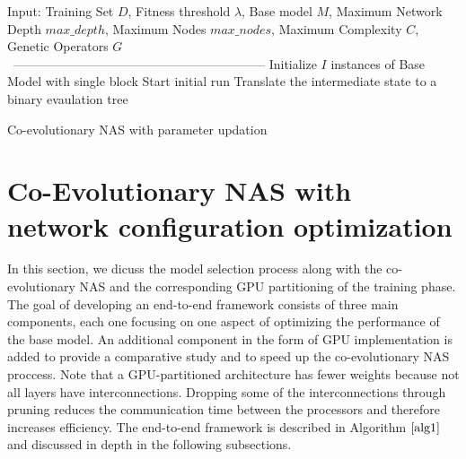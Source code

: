 \documentclass[conference]{IEEEtran}
\begin{document}
\begin{algorithm}[!t]
\scriptsize
\SetAlgoLined
Input: Training Set $D$, Fitness threshold $\lambda$, Base model $M$, Maximum Network Depth $max\_depth$, Maximum Nodes $max\_nodes$, Maximum Complexity $C$, Genetic Operators $G$\\
\
------------------------------------------------------------
Initialize $I$ instances of Base Model with single block\;
Start initial run\;
Translate the intermediate state to a binary evaulation tree\;
\caption{Co-evolutionary NAS with parameter updation}
\label{alg1}
\end{algorithm}


\section{Co-Evolutionary NAS with network configuration optimization}

In this section, we dicuss the model selection process along with the co-evolutionary NAS and the corresponding GPU partitioning of the training phase. The goal of developing an end-to-end framework consists of three main components, each one focusing on one aspect of optimizing the performance of the base model. An additional component in the form of GPU implementation is added to provide a comparative study and to speed up the co-evolutionary NAS proccess. Note that a GPU-partitioned architecture has fewer weights because not all layers have interconnections. Dropping some of the interconnections through pruning reduces the communication time between the processors and therefore increases efficiency.
The end-to-end framework is described in Algorithm $\ref{alg1}$ and discussed in depth in the following subsections.
\end{document}
